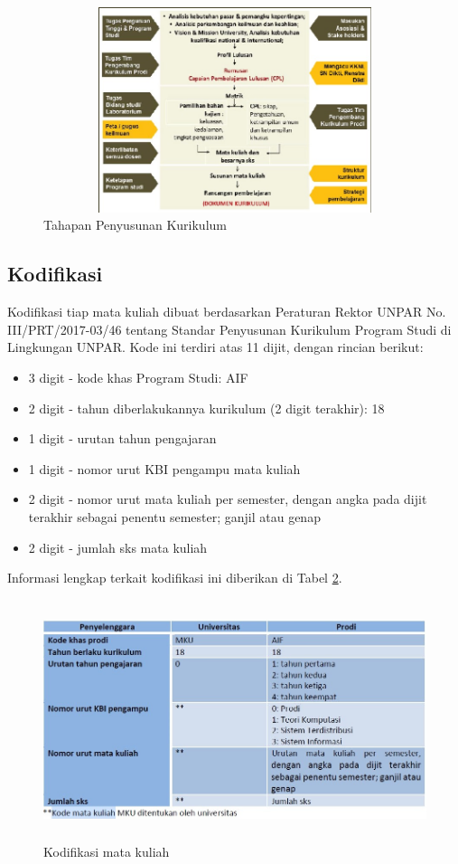 \begin{figure}[H]
    \centering
    \includegraphics[width=12cm, height=6cm]{Gambar/Penyusunan Kurikulum.jpg}
    \caption{Tahapan Penyusunan Kurikulum}
    \label{fig:gambar1}
\end{figure}

\subsection{Kodifikasi}
Kodifikasi tiap mata kuliah dibuat berdasarkan Peraturan Rektor UNPAR No. III/PRT/2017-03/46 tentang Standar Penyusunan Kurikulum Program Studi di Lingkungan UNPAR. Kode ini terdiri atas 11 dijit, dengan rincian berikut:

\begin{itemize}
    \item 3 digit - kode khas Program Studi: AIF
    \item 2 digit - tahun diberlakukannya kurikulum (2 digit terakhir): 18
    \item 1 digit - urutan tahun pengajaran
    \item 1 digit - nomor urut KBI pengampu mata kuliah
    \item 2 digit - nomor urut mata kuliah per semester, dengan angka pada dijit terakhir sebagai penentu semester; ganjil atau genap
    \item 2 digit - jumlah sks mata kuliah
\end{itemize}

Informasi lengkap terkait kodifikasi ini diberikan di Tabel \ref{fig:gambar2}.

\begin{figure}[H]
    \centering
    \includegraphics[width=12cm, height=7cm]{Gambar/Kode mata kuliah.jpg}
    \caption{Kodifikasi mata kuliah}
    \label{fig:gambar2}
\end{figure}


